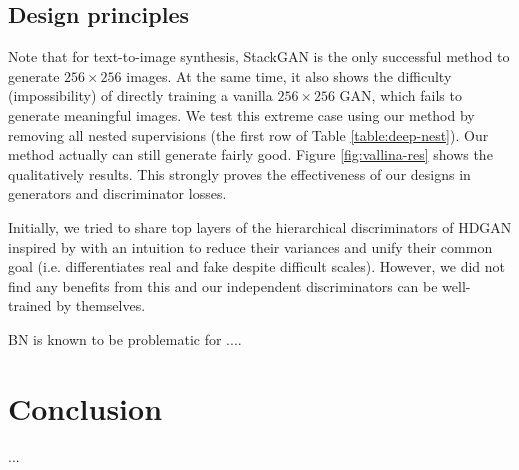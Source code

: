 \documentclass[10pt,twocolumn,letterpaper]{article}
\begin{document}
\subsection{Design principles}
Note that for text-to-image synthesis, StackGAN is the only successful method to generate $256{\times}256$ images.
At the same time, it also shows the difficulty (impossibility) of directly training a vanilla $256{\times}256$ GAN, which fails to generate meaningful images. 
We test this extreme case using our method by removing all nested supervisions (the first row of Table \ref{table:deep-nest}). 
Our method actually can still generate fairly good. Figure \ref{fig:vallina-res} shows the qualitatively results. This strongly proves the effectiveness of our designs in generators and discriminator losses.

Initially, we tried to share top layers of the hierarchical discriminators of HDGAN inspired by \cite{liu2017unsupervised} with an intuition to reduce their variances and unify their common goal (i.e. differentiates real and fake despite difficult scales). However, we did not find any benefits from this and our independent discriminators can be well-trained by themselves. 

BN is known to be problematic for .... 



\section{Conclusion}
...

{\small


}
\end{document}
